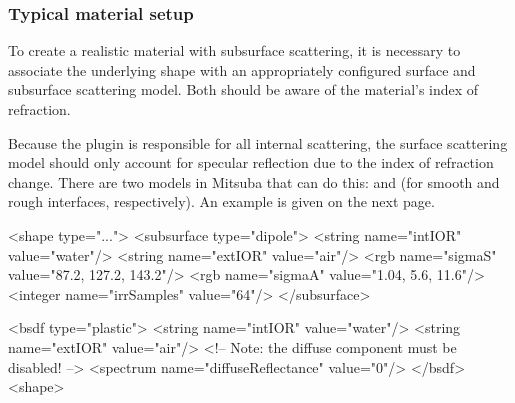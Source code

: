
\subsubsection*{Typical material setup}
To create a realistic material with subsurface scattering, it is necessary
to associate the underlying shape with an appropriately configured surface
and subsurface scattering model. Both should be aware of the material's
index of refraction.

Because the  plugin is responsible for all internal
scattering, the surface scattering model should only account for specular
reflection due to the index of refraction change. There are two models
in Mitsuba that can do this:  and
 (for smooth and rough interfaces, respectively).
An example is given on the next page.
\pagebreak
\begin{xml}
<shape type="...">
    <subsurface type="dipole">
        <string name="intIOR" value="water"/>
        <string name="extIOR" value="air"/>
        <rgb name="sigmaS" value="87.2, 127.2, 143.2"/>
        <rgb name="sigmaA" value="1.04, 5.6, 11.6"/>
        <integer name="irrSamples" value="64"/>
    </subsurface>

    <bsdf type="plastic">
        <string name="intIOR" value="water"/>
        <string name="extIOR" value="air"/>
        <!-- Note: the diffuse component must be disabled! -->
        <spectrum name="diffuseReflectance" value="0"/>
    </bsdf>
<shape>
\end{xml}

